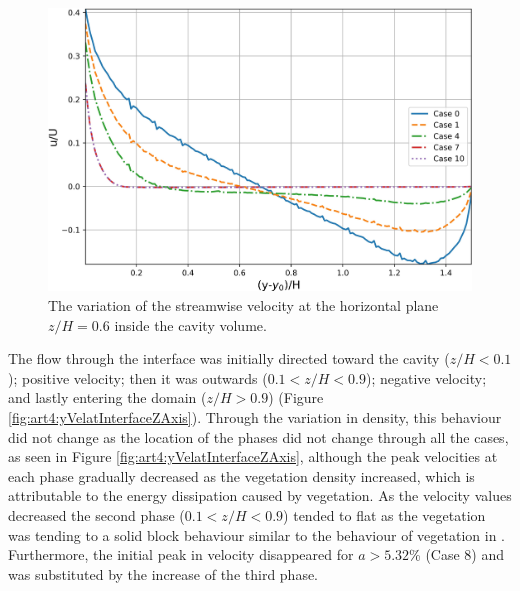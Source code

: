 \begin{figure}[!htb]
\centering
\includegraphics[width=\linewidth]{../images/art4/velXYPlane.jpg}
\caption{The variation of the streamwise velocity at the horizontal plane $z/H = 0.6$ inside the cavity volume.}
\label{fig:art4:velXYPlane}
\end{figure}
The flow through the interface was initially directed toward the cavity ($z/H < 0.1$); positive velocity; then it was outwards ($0.1 < z/H < 0.9$); negative velocity; and lastly entering the domain ($z/H > 0.9$) (Figure \ref{fig:art4:yVelatInterfaceZAxis}). Through the variation in density, this behaviour did not change as the location of the phases did not change through all the cases, as seen in Figure \ref{fig:art4:yVelatInterfaceZAxis}, although the peak velocities at each phase gradually decreased as the vegetation density increased, which is attributable to the energy dissipation caused by vegetation. As the velocity values decreased the second phase ($0.1 < z/H < 0.9$) tended to flat as the vegetation was tending to a solid block behaviour similar to the behaviour of vegetation in \cite{chen2012}. Furthermore, the initial peak in velocity disappeared for $a > 5.32$\% (Case 8) and was substituted by the increase of the third phase.

